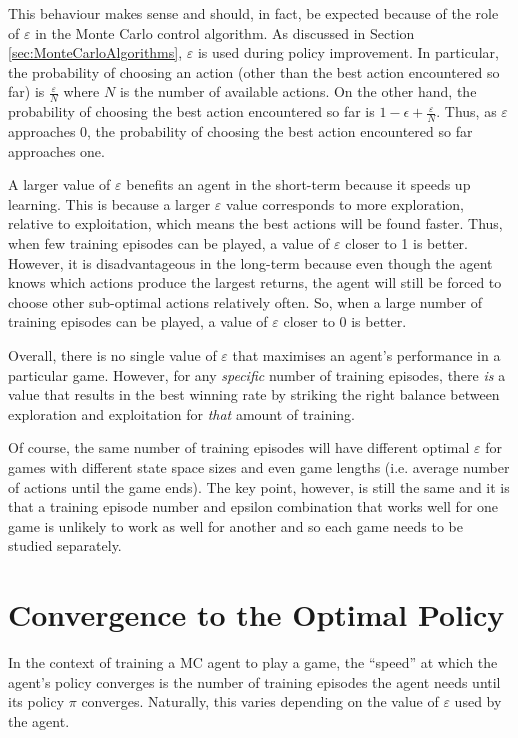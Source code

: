 \documentclass[11pt,a4paper]{report}
\begin{document}
This behaviour makes sense and should, in fact, be expected because of the role of $\varepsilon$ in the Monte Carlo control algorithm. As discussed in Section \ref{sec:MonteCarloAlgorithms}, $\varepsilon$ is used during policy improvement. In particular, the probability of choosing an action (other than the best action encountered so far) is $\frac{\varepsilon}{N}$ where $N$ is the number of available actions. On the other hand, the probability of choosing the best action encountered so far is  $1 - \epsilon + \frac{\varepsilon}{N}$. Thus, as $\varepsilon$ approaches 0, the probability of choosing the best action encountered so far approaches one.

A larger value of $\varepsilon$ benefits an agent in the short-term because it speeds up learning. This is because a larger $\varepsilon$ value corresponds to more exploration, relative to exploitation, which means the best actions will be found faster. Thus, when few training episodes can be played, a value of $\varepsilon$ closer to 1 is better. However, it is disadvantageous in the long-term because even though the agent knows which actions produce the largest returns, the agent will still be forced to choose other sub-optimal actions relatively often. So, when a large number of training episodes can be played, a value of $\varepsilon$ closer to 0 is better.

Overall, there is no single value of $\varepsilon$ that maximises an agent's performance in a particular game. However, for any \emph{specific} number of training episodes, there \emph{is} a value that results in the best winning rate by striking the right balance between exploration and exploitation for \emph{that} amount of training.

Of course, the same number of training episodes will have different optimal $\varepsilon$ for games with different state space sizes and even game lengths (i.e. average number of actions until the game ends). The key point, however, is still the same and it is that a training episode number and epsilon combination that works well for one game is unlikely to work as well for another and so each game needs to be studied separately.


\section{Convergence to the Optimal Policy}

In the context of training a MC agent to play a game, the ``speed'' at which the agent's policy converges is the number of training episodes the agent needs until its policy $\pi$ converges. Naturally, this varies depending on the value of $\varepsilon$ used by the agent.
\end{document}
